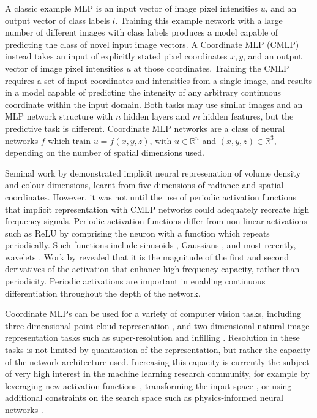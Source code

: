 \documentclass[manuscript.tex]{subfiles}
\begin{document}
A classic example MLP is an input vector of image pixel intensities \(u\), and an output vector of class labels \(l\). %
Training this example network with a large number of different images with class labels produces a model capable of predicting the class of novel input image vectors.
A Coordinate MLP (CMLP) instead takes an input of explicitly stated pixel coordinates \(x,y\), and an output vector of image pixel intensities \(u\) at those coordinates.
Training the CMLP requires a set of input coordinates and intensities from a single image, and results in a model capable of predicting the intensity of any arbitrary continuous coordinate within the input domain.
Both tasks may use similar images and an MLP network structure with \(n\) hidden layers and \(m\) hidden features, but the predictive task is different.
Coordinate MLP networks are a class of neural networks \(f\) which train \(u = f(x,y,z)\), with \(u\in\mathbb{R}^n\) and \((x,y,z)\in\mathbb{R}^3\), depending on the number of spatial dimensions used.

Seminal work by \parencite{mildenhallNeRFRepresentingScenes2020} demonstrated implicit neural represenation of volume density and colour dimensions, learnt from five dimensions of radiance and spatial coordinates.
However, it was not until the use of periodic activation functions \parencite{sitzmann2019siren} that implicit representation with CMLP networks could adequately recreate high frequency signals.
Periodic activation functions differ from non-linear activations such as ReLU by comprising the neuron with a function which repeats periodically.
Such functions include sinusoids \parencite{sitzmann2019siren}, Gaussians \parencite{ramasinghePeriodicityUnifyingFramework2022}, and most recently, wavelets \parencite{saragadamWIREWaveletImplicit2023}.
Work by \parencite{ramasinghePeriodicityUnifyingFramework2022} revealed that it is the magnitude of the first and second derivatives of the activation that enhance high-frequency capacity, rather than periodicity.
Periodic activations are important in enabling continuous differentiation throughout the depth of the network.

Coordinate MLPs can be used for a variety of computer vision tasks, including three-dimensional point cloud represenation \parencite{qiPointNetDeepHierarchical2017}, and two-dimensional natural image representation tasks such as super-resolution and infilling \parencite{leeLocalTextureEstimator2022,chenLearningContinuousImage2021}.
Resolution in these tasks is not limited by quantisation of the representation, but rather the capacity of the network architecture used.
Increasing this capacity is currently the subject of very high interest in the machine learning research community, for example by leveraging new activation functions \parencite{saragadamWIREWaveletImplicit2023}, transforming the input space \parencite[e.g.][]{benbarkaSeeingImplicitNeural2022}, or using additional constraints on the search space such as physics-informed neural networks \parencite{raissiPhysicsinformedNeuralNetworks2019}.
\end{document}
